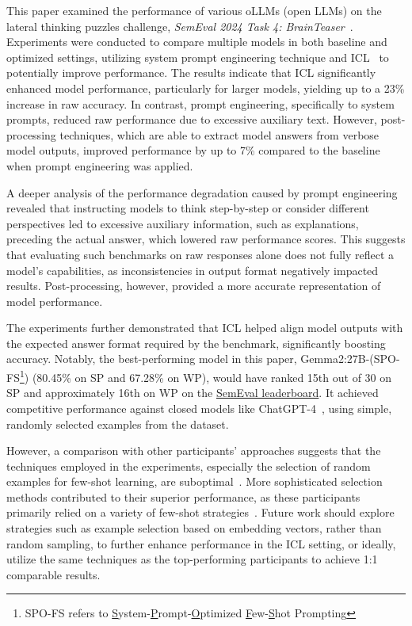This paper examined the performance of various \aclp{oLLM} (open LLMs) on the lateral thinking puzzles challenge, \textit{SemEval 2024 Task 4: BrainTeaser}~\cite{jiangBRAINTEASERLateralThinking2023}. Experiments were conducted to compare multiple models in both baseline and optimized settings, utilizing system prompt engineering technique and \acf{ICL}~\cite{brownLanguageModelsAre2020} to potentially improve performance. The results indicate that \ac{ICL} significantly enhanced model performance, particularly for larger models, yielding up to a 23\% increase in raw accuracy. In contrast, prompt engineering, specifically to system prompts, reduced raw performance due to excessive auxiliary text. However, post-processing techniques, which are able to extract model answers from verbose model outputs, improved performance by up to 7\% compared to the baseline when prompt engineering was applied.

A deeper analysis of the performance degradation caused by prompt engineering revealed that instructing models to think step-by-step or consider different perspectives led to excessive auxiliary information, such as explanations, preceding the actual answer, which lowered raw performance scores. This suggests that evaluating such benchmarks on raw responses alone does not fully reflect a model's capabilities, as inconsistencies in output format negatively impacted results. Post-processing, however, provided a more accurate representation of model performance.

The experiments further demonstrated that \ac{ICL} helped align model outputs with the expected answer format required by the benchmark, significantly boosting accuracy. Notably, the best-performing model in this paper, Gemma2:27B-(SPO-FS\footnote{SPO-FS refers to \underline{S}ystem-\underline{P}rompt-\underline{O}ptimized \underline{F}ew-\underline{S}hot Prompting}) (80.45\% on \ac{SP} and 67.28\% on \ac{WP}), would have ranked 15th out of 30 on \ac{SP} and approximately 16th on \ac{WP} on the \href{https://brainteasersem.github.io/\#leaderboard}{SemEval leaderboard}. It achieved competitive performance against closed models like ChatGPT-4~\cite{openaiGPT4TechnicalReport2024}, using simple, randomly selected examples from the dataset.

However, a comparison with other participants' approaches suggests that the techniques employed in the experiments, especially the selection of random examples for few-shot learning, are suboptimal~\cite{jiangSemEval2024Task92024}. More sophisticated selection methods contributed to their superior performance, as these participants primarily relied on a variety of few-shot strategies~\cite{jiangSemEval2024Task92024}. Future work should explore strategies such as example selection based on embedding vectors, rather than random sampling, to further enhance performance in the \ac{ICL} setting, or ideally, utilize the same techniques as the top-performing participants to achieve 1:1 comparable results.

